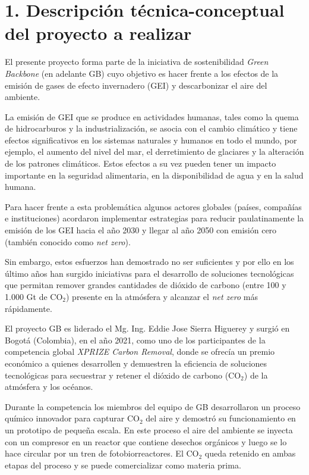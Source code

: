 \documentclass[
11pt, %
]{charter}
\begin{document}
\section{1. Descripción técnica-conceptual del proyecto a realizar}
\label{sec:descripcion}
El presente proyecto forma parte de la iniciativa de sostenibilidad \textit{Green Backbone} (en adelante GB) cuyo objetivo es hacer frente a los efectos de la emisión de gases de efecto invernadero (GEI) y descarbonizar el aire del ambiente. 

La emisión de GEI que se produce en actividades humanas, tales como la quema de hidrocarburos y la industrialización, se asocia con el cambio climático y tiene efectos significativos en los sistemas naturales y humanos en todo el mundo, por ejemplo, el aumento del nivel del mar, el derretimiento de glaciares y la alteración de los patrones climáticos. Estos efectos a su vez pueden tener un impacto importante en la seguridad alimentaria, en la disponibilidad de agua y en la salud humana. 

Para hacer frente a esta problemática algunos actores globales (países, compañías e instituciones) acordaron implementar estrategias para reducir paulatinamente la emisión de los GEI hacia el año 2030 y llegar al año 2050 con emisión cero (también conocido como \textit{net zero}). 

Sin embargo, estos esfuerzos han demostrado no ser suficientes y por ello en los último años han surgido iniciativas para el desarrollo de soluciones tecnológicas que permitan remover grandes cantidades de dióxido de carbono (entre 100 y 1.000 Gt de CO$_2$) presente en la atmósfera y alcanzar el \textit{net zero} más rápidamente.

El proyecto GB es liderado el Mg. Ing. Eddie Jose Sierra Higuerey y surgió en Bogotá (Colombia), en el año 2021, como uno de los participantes de la competencia global \textit{XPRIZE Carbon Removal}, donde se ofrecía un premio económico a quienes desarrollen y demuestren la eficiencia de soluciones tecnológicas para secuestrar y retener el dióxido de carbono (CO$_2$) de la atmósfera y los océanos.

Durante la competencia los miembros del equipo de GB desarrollaron un proceso químico innovador para capturar CO$_2$ del aire y demostró su funcionamiento en un prototipo de pequeña escala. En este proceso el aire del ambiente se inyecta con un compresor en un reactor que contiene desechos orgánicos y luego se lo hace circular por un tren de fotobiorreactores. El CO$_2$ queda retenido en ambas etapas del proceso y se puede comercializar como materia prima.
\end{document}
